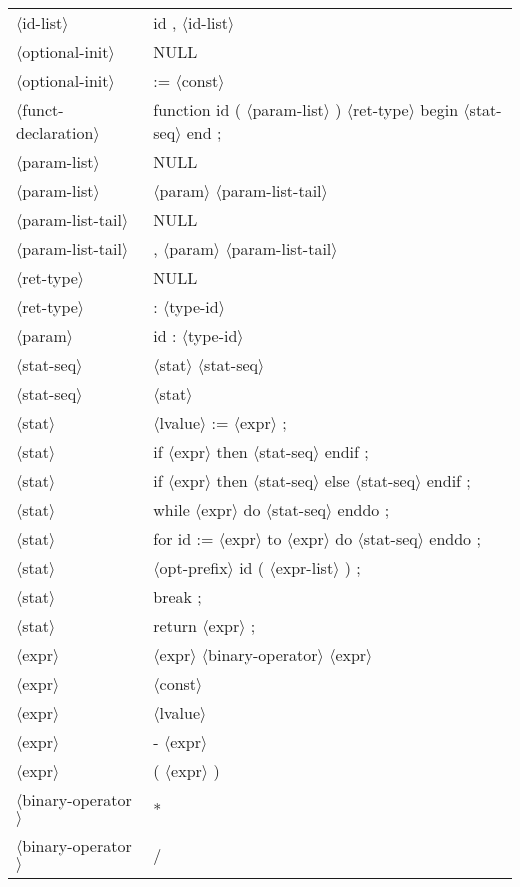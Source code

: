 \documentclass[11pt, fleqn]{article}
\newcommand{\atag}[1]{$\langle$#1$\rangle$}
\begin{document}
\begin{longtable}{l|l}
\atag{id-list}					&	id , \atag{id-list}		\\
\atag{optional-init}				&	NULL		\\
\atag{optional-init}				&	:= \atag{const}		\\
\atag{funct-declaration}			&	function id ( \atag{param-list} ) \atag{ret-type} begin \atag{stat-seq} end ;	\\
\atag{param-list}				&	NULL		\\
\atag{param-list}				&	\atag{param}	 \atag{param-list-tail}	\\
\atag{param-list-tail}			&	NULL		\\
\atag{param-list-tail}			&	, \atag{param} \atag{param-list-tail}		\\
\atag{ret-type}					&	NULL		\\
\atag{ret-type}					&	: \atag{type-id}		\\
\atag{param}						&	id : \atag{type-id}		\\
\atag{stat-seq}					&	\atag{stat} \atag{stat-seq}		\\
\atag{stat-seq}					&	\atag{stat}		\\
\atag{stat}						&	\atag{lvalue} := \atag{expr}	;	\\
\atag{stat}						&	if \atag{expr} then \atag{stat-seq} endif ;		\\
\atag{stat}						&	if \atag{expr} then \atag{stat-seq} else \atag{stat-seq} endif ;		\\
\atag{stat}						&	while \atag{expr} do \atag{stat-seq} enddo ;		\\
\atag{stat}						&	for id := \atag{expr} to \atag{expr} do \atag{stat-seq} enddo ;		\\
\atag{stat}						&	\atag{opt-prefix} id ( \atag{expr-list} ) ; \\
\atag{stat}						&	break ;		\\
\atag{stat}						&	return \atag{expr} ;		\\
\atag{expr}						&	\atag{expr} \atag{binary-operator} \atag{expr}		\\
\atag{expr}						&	\atag{const}		\\
\atag{expr}						&	\atag{lvalue}		\\
\atag{expr}						&	- \atag{expr}		\\
\atag{expr}						&	( \atag{expr} )		\\
\atag{binary-operator}			&	*	\\
\atag{binary-operator}			&	/	\\

\end{longtable}
\end{document}
